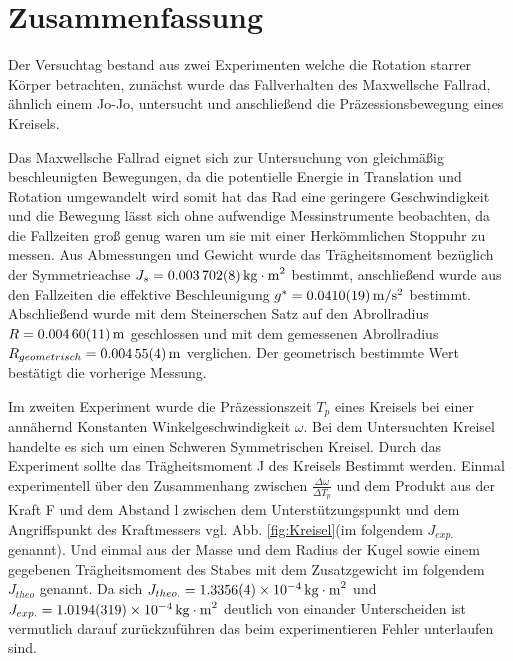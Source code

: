 
\section{Zusammenfassung}

Der Versuchtag bestand aus zwei Experimenten welche die Rotation starrer Körper betrachten, zunächst wurde das Fallverhalten des Maxwellsche Fallrad, ähnlich einem Jo-Jo, untersucht und anschließend die Präzessionsbewegung eines Kreisels. 





Das Maxwellsche Fallrad eignet sich zur Untersuchung von gleichmäßig beschleunigten Bewegungen, da die potentielle Energie in Translation und Rotation umgewandelt wird somit hat das Rad eine geringere Geschwindigkeit und die Bewegung lässt sich ohne aufwendige Messinstrumente beobachten, da die Fallzeiten groß genug waren um sie mit einer Herkömmlichen Stoppuhr zu messen.
Aus Abmessungen und Gewicht wurde das Trägheitsmoment bezüglich der Symmetrieachse $J_s=\SI{0.003702 \pm 0.000008}{kg\cdot m^2}$ bestimmt, anschließend wurde aus den Fallzeiten die effektive Beschleunigung  $g^*=\SI{0.0410 \pm  0.0019}{m \per s \squared}$ bestimmt. Abschließend wurde mit dem Steinerschen Satz auf den Abrollradius $R=\SI{0.00460\pm 0.00011}{m}$ geschlossen und mit dem gemessenen Abrollradius $R_{geometrisch}=\SI{0.00455 \pm 0.00004}{m}$ verglichen. Der geometrisch bestimmte Wert bestätigt die vorherige Messung. 






 


Im zweiten Experiment wurde die Präzessionszeit $T_p$ eines Kreisels bei einer annähernd Konstanten Winkelgeschwindigkeit $\omega$. Bei dem Untersuchten Kreisel handelte es sich um einen Schweren Symmetrischen Kreisel.
Durch das Experiment sollte das Trägheitsmoment J des Kreisels Bestimmt werden. Einmal experimentell über den Zusammenhang zwischen $\frac{\Delta \omega}{\Delta T_p}$ und dem Produkt aus der Kraft F und dem Abstand l zwischen dem Unterstützungspunkt und dem Angriffspunkt des Kraftmessers vgl. Abb. \ref{fig:Kreisel}(im folgendem $J_{exp.}$ genannt). Und einmal aus der Masse und dem Radius der Kugel sowie einem gegebenen Trägheitsmoment des Stabes mit dem Zusatzgewicht im folgendem $J_{theo}$ genannt. Da sich $J_{theo.}=\SI{1,3356+-0,0004e-4}{kg \cdot m^2}$ und $J_{exp.}=\SI{1,0194+-0,0319e-4}{kg \cdot m^2}$ deutlich von einander Unterscheiden ist vermutlich darauf zurückzuführen das beim experimentieren Fehler unterlaufen sind.  
 









